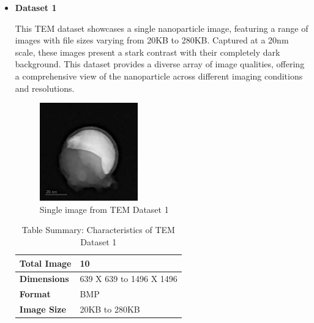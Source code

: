     \begin{itemize}
    \item \textbf{Dataset 1}
    
        This TEM dataset showcases a single nanoparticle image, featuring a range of images with file sizes varying from 20KB to 280KB. Captured at a 20nm scale, these images present a stark contrast with their completely dark background. This dataset provides a diverse array of image qualities, offering a comprehensive view of the nanoparticle across different imaging conditions and resolutions.
        
        \begin{figure}[H]
        \centering
        \includegraphics[width=0.4\textwidth]{img/Results/Dataset_1/Single_D1.jpg}
        \caption{Single image from TEM Dataset 1}\label{fig:TEM Dataset 1}
        \end{figure}
        
        \begin{table}[H]
                  \centering
                  \caption{Table Summary: Characteristics of TEM Dataset 1}
                  \begin{tabularx}{.7\linewidth}{|X|X|}
                    \hline
                    \textbf{Total Image} & 10 \\
                    \hline
                    \textbf{Dimensions} & 639 X 639 to  1496 X 1496\\
                    \hline
                    \textbf{Format} & BMP \\
                    \hline
                    \textbf{Image Size} & 20KB to 280KB \\
                    \hline
                  \end{tabularx}
        \end{table}
            

\end{itemize}
